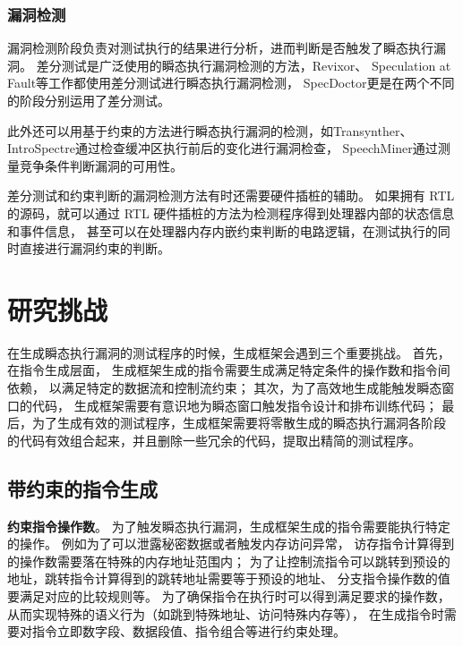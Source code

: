\subsubsection{漏洞检测}

漏洞检测阶段负责对测试执行的结果进行分析，进而判断是否触发了瞬态执行漏洞。
差分测试是广泛使用的瞬态执行漏洞检测的方法，Revixor\cite{oleksenko2022revizor}、
Speculation at Fault\cite{hofmann2023speculation}等工作都使用差分测试进行瞬态执行漏洞检测，
SpecDoctor\cite{hur2022specdoctor}更是在两个不同的阶段分别运用了差分测试。\par

此外还可以用基于约束的方法进行瞬态执行漏洞的检测，如Transynther\cite{moghimi2020medusa}、
IntroSpectre\cite{ghaniyoun2021introspectre}通过检查缓冲区执行前后的变化进行漏洞检查，
SpeechMiner\cite{xiao2019speechminer}通过测量竞争条件判断漏洞的可用性。\par

差分测试和约束判断的漏洞检测方法有时还需要硬件插桩的辅助。
如果拥有 RTL 的源码，就可以通过 RTL 硬件插桩的方法为检测程序得到处理器内部的状态信息和事件信息，
甚至可以在处理器内存内嵌约束判断的电路逻辑，在测试执行的同时直接进行漏洞约束的判断。

\section{研究挑战}

在生成瞬态执行漏洞的测试程序的时候，生成框架会遇到三个重要挑战。
首先，在指令生成层面，
生成框架生成的指令需要生成满足特定条件的操作数和指令间依赖，
以满足特定的数据流和控制流约束；
其次，为了高效地生成能触发瞬态窗口的代码，
生成框架需要有意识地为瞬态窗口触发指令设计和排布训练代码；
最后，为了生成有效的测试程序，生成框架需要将零散生成的瞬态执行漏洞各阶段
的代码有效组合起来，并且删除一些冗余的代码，提取出精简的测试程序。

\subsection{带约束的指令生成}
\textbf{约束指令操作数}。
为了触发瞬态执行漏洞，生成框架生成的指令需要能执行特定的操作。
例如为了可以泄露秘密数据或者触发内存访问异常，
访存指令计算得到的操作数需要落在特殊的内存地址范围内；
为了让控制流指令可以跳转到预设的地址，跳转指令计算得到的跳转地址需要等于预设的地址、
分支指令操作数的值要满足对应的比较规则等。
为了确保指令在执行时可以得到满足要求的操作数，从而实现特殊的语义行为（如跳到特殊地址、访问特殊内存等），
在生成指令时需要对指令立即数字段、数据段值、指令组合等进行约束处理。\par

